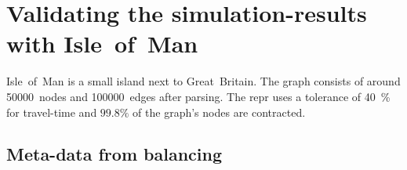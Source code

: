 \section{Validating the simulation-results with Isle~of~Man}

    Isle~of~Man is a small island next to Great~Britain.
    The graph consists of around \num{50000}~nodes and \num{100000}~edges after parsing.
    The \gls{repr} uses a tolerance of \si{40 \percent} for travel-time and $\si{\num{99.8} \percent}$ of the graph's nodes are contracted.

    \subsection{Meta-data from balancing}
    \label{chap:experiments:meta}

